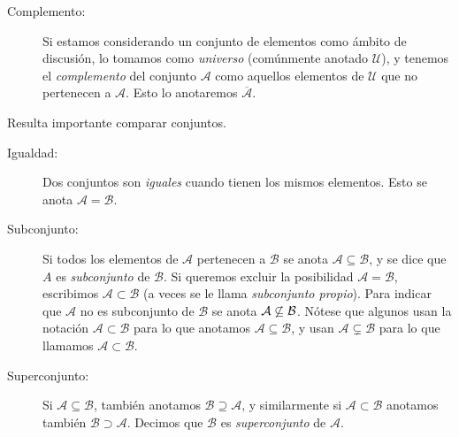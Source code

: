 \begin{description}
  \item[Complemento:]
      Si estamos considerando
      un conjunto de elementos como ámbito de discusión,
      lo tomamos como \emph{universo}%
      (comúnmente anotado \(\mathcal{U}\)),
      y tenemos el \emph{complemento} del conjunto \(\mathcal{A}\)
      como aquellos elementos de \(\mathcal{U}\)
      que no pertenecen a \(\mathcal{A}\).
      Esto lo anotaremos \(\overline{\mathcal{A}}\).
  \end{description}

  Resulta importante comparar conjuntos.
  \begin{description}
  \item[Igualdad:]
    Dos conjuntos son \emph{iguales}
    cuando tienen los mismos elementos.
    Esto se anota \(\mathcal{A} = \mathcal{B}\).
  \item[Subconjunto:]
    Si todos los elementos de \(\mathcal{A}\)
    pertenecen a \(\mathcal{B}\)
    se anota \(\mathcal{A} \subseteq \mathcal{B}\),
    y se dice que \(A\) es \emph{subconjunto} de \(\mathcal{B}\).
    Si queremos excluir
    la posibilidad \(\mathcal{A} = \mathcal{B}\),
    escribimos \(\mathcal{A} \subset \mathcal{B}\)
    (a veces se le llama \emph{subconjunto propio}).
    Para indicar
    que \(\mathcal{A}\) no es subconjunto de \(\mathcal{B}\)
    se anota \(\mathcal{A} \centernot\subseteq \mathcal{B}\).
    Nótese
    que algunos usan la notación \(\mathcal{A} \subset \mathcal{B}\)
    para lo que anotamos \(\mathcal{A} \subseteq \mathcal{B}\),
    y usan \(\mathcal{A} \subsetneq \mathcal{B}\)
    para lo que llamamos \(\mathcal{A} \subset \mathcal{B}\).
  \item[Superconjunto:]
    Si \(\mathcal{A} \subseteq \mathcal{B}\),
    también anotamos \(\mathcal{B} \supseteq \mathcal{A}\),
    y similarmente si \(\mathcal{A} \subset \mathcal{B}\)
    anotamos también \(\mathcal{B} \supset \mathcal{A}\).
    Decimos que \(\mathcal{B}\)
    es \emph{superconjunto} de \(\mathcal{A}\).
  \end{description}

